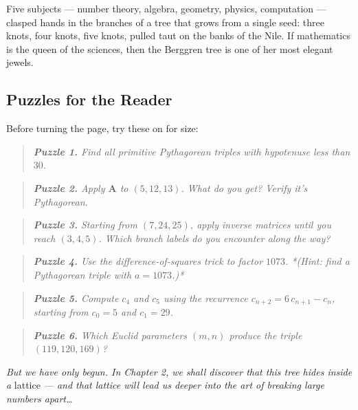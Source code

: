 Five subjects --- number theory, algebra, geometry, physics, computation --- clasped hands in the branches of a tree that grows from a single seed: three knots, four knots, five knots, pulled taut on the banks of the Nile. If mathematics is the queen of the sciences, then the Berggren tree is one of her most elegant jewels.


\bigskip


\subsection*{Puzzles for the Reader}

Before turning the page, try these on for size:

\begin{quote}
\itshape \textbf{Puzzle 1.} Find all primitive Pythagorean triples with hypotenuse less than $30$.
\end{quote}

\begin{quote}
\itshape \textbf{Puzzle 2.} Apply $\mathbf{A}$ to $(5, 12, 13)$. What do you get? Verify it's Pythagorean.
\end{quote}

\begin{quote}
\itshape \textbf{Puzzle 3.} Starting from $(7, 24, 25)$, apply inverse matrices until you reach $(3, 4, 5)$. Which branch labels do you encounter along the way?
\end{quote}

\begin{quote}
\itshape \textbf{Puzzle 4.} Use the difference-of-squares trick to factor $1073$. *(Hint: find a Pythagorean triple with $a = 1073$.)*
\end{quote}

\begin{quote}
\itshape \textbf{Puzzle 5.} Compute $c_4$ and $c_5$ using the recurrence $c_{n+2} = 6\,c_{n+1} - c_n$, starting from $c_0 = 5$ and $c_1 = 29$.
\end{quote}

\begin{quote}
\itshape \textbf{Puzzle 6.} Which Euclid parameters $(m, n)$ produce the triple $(119, 120, 169)$?
\end{quote}


\bigskip


\textit{But we have only begun. In Chapter 2, we shall discover that this tree hides inside a} lattice \textit{--- and that lattice will lead us deeper into the art of breaking large numbers apart\ldots{}}

